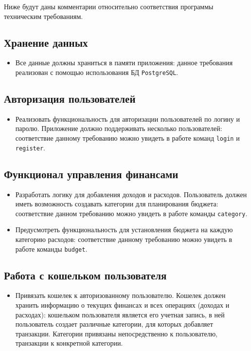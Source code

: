 \documentclass[a4paper, 14pt]{article}
\begin{document}
Ниже будут даны комментарии относительно соответствия программы техническим требованиям.

\subsection{Хранение данных}

\begin{itemize}
	\item Все данные должны храниться в памяти приложения: данное требования реализован с помощью использования БД \texttt{PostgreSQL}.
\end{itemize}

\subsection{Авторизация пользователей}

\begin{itemize}
	\item Реализовать функциональность для авторизации пользователей по логину и паролю. Приложение должно поддерживать несколько пользователей: соответствие данному требованию можно увидеть в работе команд \texttt{login} и \texttt{register}.
\end{itemize}

\subsection{Функционал управления финансами}

\begin{itemize}
	\item Разработать логику для добавления доходов и расходов. Пользователь должен иметь возможность создавать категории для планирования бюджета: соответствие данном требованию можно увидеть в работе команды \texttt{category}.
	\item Предусмотреть функциональность для установления бюджета на каждую категорию расходов: соответствие данному требованию можно увидеть в работе команды \texttt{budget}.
\end{itemize}

\subsection{Работа с кошельком пользователя}

\begin{itemize}
	\item Привязать кошелек к авторизованному пользователю. Кошелек должен хранить информацию о текущих финансах и всех операциях (доходах и расходах): кошельком пользователя является его учетная запись, в ней пользователь создает различные категории, для которых добавляет транзакции. Категории привязаны непосредственно к пользователю, транзакции к конкретной категории.
\end{itemize}
\end{document}
